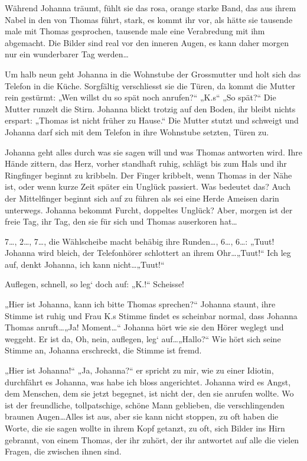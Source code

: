 \documentclass[10pt,titlepage,a5paper]{book}
\begin{document}
Während Johanna träumt, fühlt sie das rosa, orange starke Band, das aus ihrem Nabel in den von Thomas führt, stark, es kommt ihr vor, als hätte sie tausende male mit Thomas gesprochen, tausende male eine Verabredung mit ihm abgemacht. Die Bilder sind real vor den inneren Augen, es kann daher morgen nur ein wunderbarer Tag werden\dots 

Um halb neun geht Johanna in die Wohnstube der Grossmutter und holt sich das Telefon in die Küche. Sorgfältig verschliesst sie die Türen, da kommt die Mutter rein gestürmt: „Wen willst du so spät noch anrufen?“ „K.s“ „So spät?“ Die Mutter runzelt die Stirn. Johanna blickt trotzig auf den Boden, ihr bleibt nichts erspart: „Thomas ist nicht früher zu Hause.“ Die Mutter stutzt und schweigt und Johanna darf sich mit dem Telefon in ihre Wohnstube setzten, Türen zu.

Johanna geht alles durch was sie sagen will und was Thomas antworten wird. Ihre Hände zittern, das Herz, vorher standhaft ruhig, schlägt bis zum Hals und ihr Ringfinger beginnt zu kribbeln. Der Finger kribbelt, wenn Thomas in der Nähe ist, oder wenn kurze Zeit später ein Unglück passiert. Was bedeutet das? Auch der Mittelfinger beginnt sich auf zu führen  als sei eine Herde Ameisen darin unterwegs. Johanna bekommt Furcht, doppeltes Unglück? Aber, morgen ist der freie Tag, ihr Tag, den sie für sich und Thomas auserkoren hat\dots 

7\dots , 2\dots , 7\dots, die Wählscheibe macht behäbig ihre Runden\dots , 6\dots, 6\dots : „Tuut! Johanna wird bleich, der Telefonhörer schlottert an ihrem Ohr\dots  „Tuut!“ Ich leg auf, denkt Johanna, ich kann nicht\dots  „Tuut!“

Auflegen, schnell, so leg` doch auf: „K.!“ Scheisse!

„Hier ist Johanna, kann ich bitte Thomas sprechen?“ Johanna staunt, ihre Stimme ist ruhig und Frau K.s Stimme findet es scheinbar normal, dass Johanna Thomas anruft\dots  „Ja! Moment\dots “ Johanna hört wie sie den Hörer weglegt und weggeht. Er ist da, Oh, nein, auflegen, leg` auf\dots  „Hallo?“ Wie hört sich seine Stimme an, Johanna erschreckt, die Stimme ist fremd.

„Hier ist Johanna!“ „Ja, Johanna?“ er spricht zu mir, wie zu einer Idiotin, durchfährt es Johanna, was habe ich bloss angerichtet. Johanna wird es Angst, dem Menschen, dem sie jetzt begegnet, ist nicht der, den sie anrufen wollte. Wo ist der freundliche, tollpatschige, schöne Mann geblieben, die verschlingenden braunen Augen\dots  Alles ist aus, aber sie kann nicht stoppen, zu oft haben die Worte, die sie sagen wollte in ihrem Kopf getanzt, zu oft, sich Bilder ins Hirn gebrannt, von einem Thomas, der ihr zuhört, der ihr antwortet auf alle die vielen Fragen, die zwischen ihnen sind.
\end{document}
